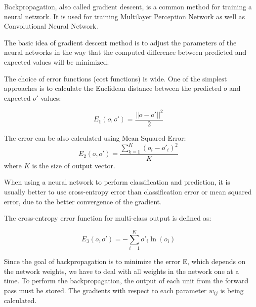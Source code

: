 Backpropagation, also called gradient descent, is a common method for training a neural network. It is used for training Multilayer Perception Network as well as Convolutional Neural Network.

The basic idea of gradient descent method is to adjust the parameters of the neural networks in the way that the computed difference between predicted and expected values will be minimized. 

The choice of error functions (cost functions) is wide. One of the simplest approaches is to calculate the Euclidean distance between the predicted $o$ and expected $o'$ values: 

\begin{equation}
E_{1}(o,o') = \frac{||o-o'||^{2}}{2}
\end{equation}

The error can be also calculated using Mean Squared Error: 
\begin{equation}
E_{2}(o,o') = \frac{\sum_{k=1}^{K}(o_{i} - o'_{i})^2}{K}
\end{equation}
where $K$ is the size of output vector.

When using a neural network to perform classification and prediction, it is usually better to use cross-entropy error than classification error or mean squared error, due to the better convergence of the gradient.

The cross-entropy error function for multi-class output is defined as:

\begin{equation}
E_{3}(o, o') = -\sum_{i=1}^K o'_{i} \ln(o_{i})\end{equation} 


Since the goal of backpropagation is to minimize the error E, which depends on the network weights, we have to deal with all weights in the network one at a time.
To perform the backpropagation, the output of each unit from the forward pass must be stored. The gradients with respect to each parameter $w_{ij}$ is being calculated.

